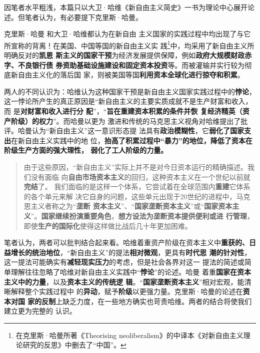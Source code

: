 因笔者水平粗浅，本篇只以大卫·哈维《新自由主义简史》一书为理论中心展开论述。但笔者认为，有必要提下克里斯·哈曼。

克里斯·哈曼\cite{chrisharmanneo1} \cite{chrisharmanneo2}和大卫·哈维都认为在新自由
主义国家的实践过程中均出现了与它所宣称的背离！在美国、中国等国的新自由主义实
践\footnote{在克里斯·哈曼所著《Theorising neoliberalism》的中译本《对新自由主义理
  论研究的反思》中删去了“中国”。}中，均采用了新自由主义所明确反对的\textbf{凯恩
  斯主义的国家干预}为经济发展提供保障，例如\textbf{政府大规模财政赤字、不良银行债
  券资助基础设施建设和固定资本投资}等。而被灌输并实行较为彻底新自由主义化的落后国
家，则被美国等国\textbf{利用资本全球化进行掠夺和积累}。

两人的不同认识为：哈维认为这种国家干预是新自由主义国家实践过程中的\textbf{悖论}，
这一悖论所产生的真正原因是“新自由主义的主要实质成就不是生产财富和收入，而
是\textbf{对财富和收入进行分
  配}”，“\textbf{旨在重建资本积累的条件并恢
  复经济精英（资产阶级）的权力}”。而哈曼以更为
激进和传统的马克思主义视角对哈维提出了批评。哈曼认为“新自由主义”这一意识形态提
法具有\textbf{政治模糊性}，它\textbf{弱化了国家支出}在新自由主义实践中的地
位，\textbf{抬高了积累过程中“暴力”的地位，降低了资本在阶级生产方面的强大理性，
  弱化了工人阶级的力量。}
\begin{quotation}
  由于这些原因，“新自由主义”实际上并不是对今日资本运行的精确描述。我们没有面临
  向\textbf{自由市场资本主义}的回归，这种资本主义在一个世纪以前就\textbf{完结}了。
  我们面临的是这样一个体系，它尝试着在全球范围内\textbf{重建}它体系的各个单元来解
  决它自身的问题，这些单元出现于20世纪的进程中，马克思主义者称之为“\textbf{垄断
    资本主义}”、“\textbf{国家垄断资本主义}”或“\textbf{国家资本主
    义}”。\textbf{国家继续扮演重要角色}，\textbf{想方设法为垄断资本提供便利或进
    行管理}，即使\textbf{生产的国际化}使得这样做比战后几十年更加困难。
\end{quotation}

笔者认为，两者可以批判结合起来看。哈维着重资产阶级在资本主义中\textbf{重获的、日
  益增长的统治地位}，“新自由主义”的提法\textbf{相对微观}，更具有\textbf{时代思
  潮的针对性}，这一提法可能确实有\textbf{减轻现实压力}的考虑，但是社会各界对这一
提法的简述或简单理解往往忽略了哈维对新自由主义实践中“\textbf{悖论}”的论述。哈曼
着重\textbf{国家在资本主义中的力量}，以及\textbf{资本主义的传统逻
  辑}。“\textbf{国家垄断资本主义}”相对宏观，能清晰解释整个实践过程中
的\textbf{异动}，赋予\textbf{阶级}以更强力量。克里斯·哈曼的论述在\textbf{资本对国
  家的反制}上缺乏力度，在一些地方确实也苛责哈维。两者的结合将使我们建立更为完整的
认识。

